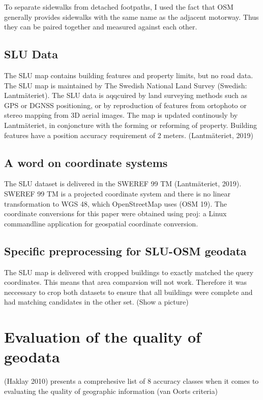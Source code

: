 \documentclass[a4paper]{article}
\begin{document}
To separate sidewalks from detached footpaths, I used the fact that OSM generally provides sidewalks with the same name as the adjacent motorway. Thus they can be paired together and measured against each other.

\subsection{SLU Data}

The SLU map contains building features and property limits, but no road data.
The SLU map is maintained by The Swedish National Land Survey (Swedish: Lantmäteriet).
The SLU data is aqqcuired by land surveying methods such as GPS or DGNSS positioning, or by reproduction of features from ortophoto or stereo mapping from 3D aerial images.
The map is updated continously by Lantmäteriet, in conjoncture with the forming or reforming of property.
Building features have a position accuracy requirement of 2 meters.
(Lantmäteriet, 2019)

\subsection{A word on coordinate systems}

The SLU dataset is delivered in the SWEREF 99 TM (Lantmäteriet, 2019). SWEREF 99 TM is a projected coordinate system and there is no linear transformation to WGS 48, which OpenStreetMap uses (OSM 19). The coordinate conversions for this paper were obtained using proj: a Linux commandline application for geospatial coordinate conversion.

\subsection{Specific preprocessing for SLU-OSM geodata}

The SLU map is delivered with cropped buildings to exactly matched the query coordinates. This means that area comparsion will not work.
Therefore it was neccessary to crop both datasets to ensure that all buildings were complete and had matching candidates in the other set.
(Show a picture)

\section{Evaluation of the quality of geodata}

(Haklay 2010) presents a comprehesive list of 8 accuracy classes when it comes to evaluating the quality of geographic information (van Oorts criteria)
\end{document}
